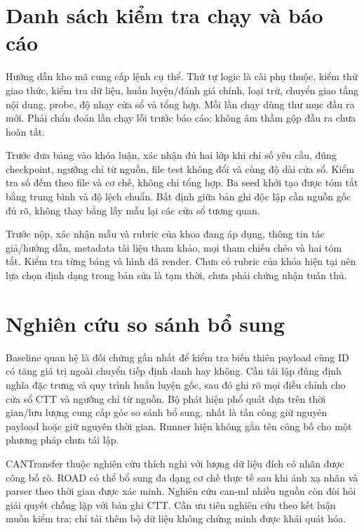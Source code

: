 \documentclass[12pt,a4paper,oneside,openany]{extbook}
\begin{document}
\section{Danh sách kiểm tra chạy và báo cáo}
Hướng dẫn kho mã cung cấp lệnh cụ thể. Thứ tự logic là cài phụ thuộc, kiểm thử giao thức, kiểm tra dữ liệu, huấn luyện/đánh giá chính, loại trừ, chuyển giao tầng nội dung, probe, độ nhạy cửa sổ và tổng hợp. Mỗi lần chạy dùng thư mục đầu ra mới. Phải chẩn đoán lần chạy lỗi trước báo cáo; không âm thầm gộp đầu ra chưa hoàn tất.

Trước đưa bảng vào khóa luận, xác nhận đủ hai lớp khi chỉ số yêu cầu, đúng checkpoint, ngưỡng chỉ từ nguồn, file test không đổi và cùng độ dài cửa sổ. Kiểm tra số đếm theo file và cơ chế, không chỉ tổng hợp. Ba seed khởi tạo được tóm tắt bằng trung bình và độ lệch chuẩn. Bất định giữa bản ghi độc lập cần nguồn gốc đủ rõ, không thay bằng lấy mẫu lại các cửa sổ tương quan.

Trước nộp, xác nhận mẫu và rubric của khoa đang áp dụng, thông tin tác giả/hướng dẫn, metadata tài liệu tham khảo, mọi tham chiếu chéo và hai tóm tắt. Kiểm tra từng bảng và hình đã render. Chưa có rubric của khóa hiện tại nên lựa chọn định dạng trong bản sửa là tạm thời, chưa phải chứng nhận tuân thủ.

\section{Nghiên cứu so sánh bổ sung}
Baseline quan hệ là đối chứng gần nhất để kiểm tra biến thiên payload cùng ID có tăng giá trị ngoài chuyển tiếp định danh hay không. Cần tái lập đúng định nghĩa đặc trưng và quy trình huấn luyện gốc, sau đó ghi rõ mọi điều chỉnh cho cửa sổ CTT và ngưỡng chỉ từ nguồn. Bộ phát hiện phổ quát dựa trên thời gian/lưu lượng cung cấp góc so sánh bổ sung, nhất là tấn công giữ nguyên payload hoặc giữ nguyên thời gian. Runner hiện không gắn tên công bố cho một phương pháp chưa tái lập.

CANTransfer thuộc nghiên cứu thích nghi với lượng dữ liệu đích có nhãn được công bố rõ. ROAD có thể bổ sung đa dạng cơ chế thực tế sau khi ánh xạ nhãn và parser theo thời gian được xác minh. Nghiên cứu can-ml nhiều nguồn còn đòi hỏi giải quyết chồng lặp với bản ghi CTT. Cần ưu tiên nghiên cứu theo kết luận muốn kiểm tra; chỉ tải thêm bộ dữ liệu không chứng minh được khái quát hóa.

\backmatter{}
\end{document}
